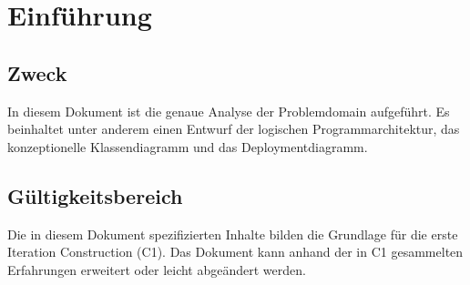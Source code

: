 \chapter{Einführung}

\section{Zweck}
In diesem Dokument ist die genaue Analyse der Problemdomain aufgeführt. Es beinhaltet unter anderem einen Entwurf der logischen Programmarchitektur, das konzeptionelle Klassendiagramm und das Deploymentdiagramm.

\section{Gültigkeitsbereich}
Die in diesem Dokument spezifizierten Inhalte bilden die Grundlage für die erste Iteration Construction (C1). Das Dokument kann anhand der in C1 gesammelten Erfahrungen erweitert oder leicht abgeändert werden.
